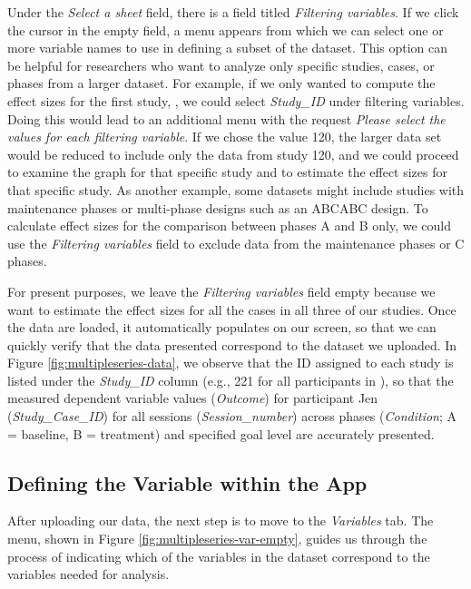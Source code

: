 \documentclass[
]{book}
\begin{document}
Under the \emph{Select a sheet} field, there is a field titled \emph{Filtering variables}. If we click the cursor in the empty field, a menu appears from which we can select one or more variable names to use in defining a subset of the dataset. This option can be helpful for researchers who want to analyze only specific studies, cases, or phases from a larger dataset. For example, if we only wanted to compute the effect sizes for the first study, \citet{Byiers2014}, we could select \emph{Study\_ID} under filtering variables. Doing this would lead to an additional menu with the request \emph{Please select the values for each filtering variable}. If we chose the value 120, the larger data set would be reduced to include only the data from study 120, and we could proceed to examine the graph for that specific study and to estimate the effect sizes for that specific study. As another example, some datasets might include studies with maintenance phases or multi-phase designs such as an ABCABC design. To calculate effect sizes for the comparison between phases A and B only, we could use the \emph{Filtering variables} field to exclude data from the maintenance phases or C phases.

For present purposes, we leave the \emph{Filtering variables} field empty because we want to estimate the effect sizes for all the cases in all three of our studies. Once the data are loaded, it automatically populates on our screen, so that we can quickly verify that the data presented correspond to the dataset we uploaded. In Figure \ref{fig:multipleseries-data}, we observe that the ID assigned to each study is listed under the \emph{Study\_ID} column (e.g., 221 for all participants in \citet{Byiers2014}), so that the measured dependent variable values (\emph{Outcome}) for participant Jen (\emph{Study\_Case\_ID}) for all sessions (\emph{Session\_number}) across phases (\emph{Condition}; A = baseline, B = treatment) and specified goal level are accurately presented.

\hypertarget{defining-the-variable-within-the-app}{%
\subsection{Defining the Variable within the App}\label{defining-the-variable-within-the-app}}

After uploading our data, the next step is to move to the \emph{Variables} tab. The menu, shown in Figure \ref{fig:multipleseries-var-empty}, guides us through the process of indicating which of the variables in the dataset correspond to the variables needed for analysis.
\end{document}
